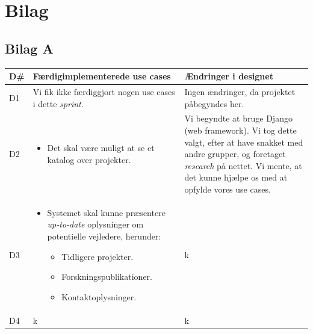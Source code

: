 \documentclass[12pt]{article}
\begin{document}
\newpage
\section{Bilag}
\label{sec:bilag}

\subsection{Bilag A}
\label{sec:bilagA}
\begin{center}
	\begin{tabular}{|p{}|p{}|p{}|}
		\hline
	\textbf{D\#} & \textbf{Færdigimplementerede use cases} & \textbf{Ændringer i designet} \\ \hline

	D1 & Vi fik ikke færdiggjort nogen use cases i dette \textit{sprint}. & Ingen ændringer, da projektet påbegyndes her. \\ \hline

	D2 & 		\begin{minipage}[t]{0.4\textwidth}
	\begin{itemize}
		\item Det skal være muligt at se et katalog over projekter.
		\end{itemize}
		\end{minipage} & Vi begyndte at bruge Django (web framework). Vi tog dette valgt, efter at have snakket med andre grupper, og foretaget \textit{research} på nettet. Vi mente, at det kunne hjælpe os med at opfylde vores use cases. \\ \hline

	D3 &
	\begin{minipage}[t]{0.4\textwidth}
	\begin{itemize}
		\item Systemet skal kunne præsentere \textit{up-to-date} oplysninger om potentielle vejledere, herunder:
		\begin{itemize}
			\item Tidligere projekter.
			\item Forskningspublikationer.
			\item Kontaktoplysninger.
		\end{itemize}
	\end{itemize}
	\end{minipage} & k \\
		\hline
	D4 & k & k \\ \hline
	\end{tabular}
\end{center}~\\
\end{document}
